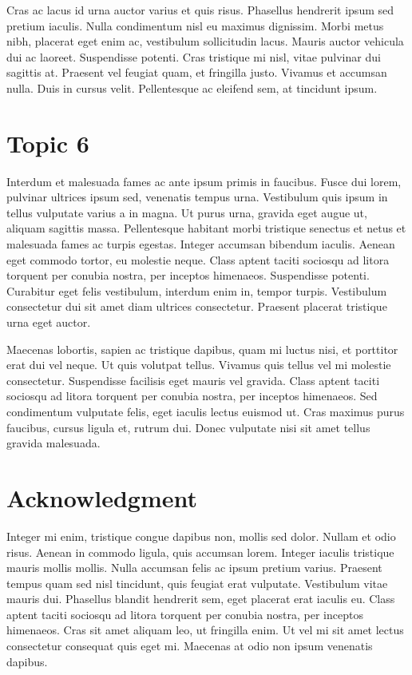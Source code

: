 \documentclass[10pt]{article}
\begin{document}
Cras ac lacus id urna auctor varius et quis risus. Phasellus hendrerit ipsum sed pretium iaculis. Nulla condimentum nisl eu maximus dignissim. Morbi metus nibh, placerat eget enim ac, vestibulum sollicitudin lacus. Mauris auctor vehicula dui ac laoreet. Suspendisse potenti. Cras tristique mi nisl, vitae pulvinar dui sagittis at. Praesent vel feugiat quam, et fringilla justo. Vivamus et accumsan nulla. Duis in cursus velit. Pellentesque ac eleifend sem, at tincidunt ipsum.

\section{Topic 6}
Interdum et malesuada fames ac ante ipsum primis in faucibus. Fusce dui lorem, pulvinar ultrices ipsum sed, venenatis tempus urna. Vestibulum quis ipsum in tellus vulputate varius a in magna. Ut purus urna, gravida eget augue ut, aliquam sagittis massa. Pellentesque habitant morbi tristique senectus et netus et malesuada fames ac turpis egestas. Integer accumsan bibendum iaculis. Aenean eget commodo tortor, eu molestie neque. Class aptent taciti sociosqu ad litora torquent per conubia nostra, per inceptos himenaeos. Suspendisse potenti. Curabitur eget felis vestibulum, interdum enim in, tempor turpis. Vestibulum consectetur dui sit amet diam ultrices consectetur. Praesent placerat tristique urna eget auctor.

Maecenas lobortis, sapien ac tristique dapibus, quam mi luctus nisi, et porttitor erat dui vel neque. Ut quis volutpat tellus. Vivamus quis tellus vel mi molestie consectetur. Suspendisse facilisis eget mauris vel gravida. Class aptent taciti sociosqu ad litora torquent per conubia nostra, per inceptos himenaeos. Sed condimentum vulputate felis, eget iaculis lectus euismod ut. Cras maximus purus faucibus, cursus ligula et, rutrum dui. Donec vulputate nisi sit amet tellus gravida malesuada.

\section*{Acknowledgment}
Integer mi enim, tristique congue dapibus non, mollis sed dolor. Nullam et odio risus. Aenean in commodo ligula, quis accumsan lorem. Integer iaculis tristique mauris mollis mollis. Nulla accumsan felis ac ipsum pretium varius. Praesent tempus quam sed nisl tincidunt, quis feugiat erat vulputate. Vestibulum vitae mauris dui. Phasellus blandit hendrerit sem, eget placerat erat iaculis eu. Class aptent taciti sociosqu ad litora torquent per conubia nostra, per inceptos himenaeos. Cras sit amet aliquam leo, ut fringilla enim. Ut vel mi sit amet lectus consectetur consequat quis eget mi. Maecenas at odio non ipsum venenatis dapibus. 

\printbibliography[title={References}] %
\end{document}
